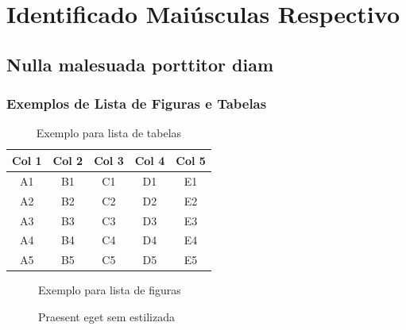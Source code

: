 \documentclass[a4paper,12pt,brazilian,oneside]{Arquivos/Relatorio}
\begin{document}
\anexos
\chapter{Identificado Maiúsculas Respectivo}
\section{Nulla malesuada porttitor diam}
\lipsum[3]

\subsection{Exemplos de Lista de Figuras e Tabelas}
\lipsum[15]

\begin{table}[ht]
    \centering
    \label{tab:estilosa}
    \begin{tabular}{ccccc}
        \toprule
        Col 1 & Col 2 & Col 3 & Col 4 & Col 5 \\
        \midrule
        A1 & B1 & C1 & D1 & E1 \\
        A2 & B2 & C2 & D2 & E2 \\
        A3 & B3 & C3 & D3 & E3 \\
        A4 & B4 & C4 & D4 & E4 \\
        A5 & B5 & C5 & D5 & E5 \\
        \bottomrule
    \end{tabular}
    \caption{Exemplo para lista de tabelas}
\end{table}

\begin{figure}[ht]
    \centering
    \caption{Exemplo para lista de figuras}
    \label{fig:teste-estilosa}
\end{figure}
\begin{figure}[ht]
    \centering
    \caption{Praesent eget sem estilizada}
    \label{fig:teste-estilosa}
\end{figure}
\end{document}

